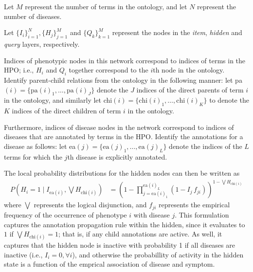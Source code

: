 Let $M$ represent the number of terms in the ontology, and let $N$ represent the
number of diseases.

Let 
$\{I_i\}_{i=1}^{N}, 
\{H_j\}_{j=1}^{M}$ and 
$\{Q_k\}_{k=1}^{M}$ represent the nodes in the {\it item}, {\it hidden} and {\it
query} layers, respectively.

Indices of phenotypic nodes in this network correspond to indices of terms in
the HPO;
%
i.e., $H_i$ and $Q_i$ together correspond to the $i$th node in the ontology.
%
Identify parent-child relations from the ontology in the following manner:
%
let pa$(i) = \{\text{pa}(i)_1, \hdots, \text{pa}(i)_J\}$ denote the $J$ indices
of the direct parents of term $i$ in the ontology, 
%
and similarly let chi$(i) = \{\text{chi}(i)_1, \hdots, \text{chi}(i)_K\}$ to
denote the $K$ indices of the direct children of term $i$ in the ontology.

Furthermore, indices of disease nodes in the network correspond to indices of
diseases that are annotated by terms in the HPO.
%
Identify the annotations for a disease as follows: let ea$(j) =
\{\text{ea}(j)_1, \hdots, \text{ea}(j)_L\}$ denote the indices of the $L$ terms
for which the $j$th disease is explicitly annotated.

The local probability distributions for the hidden nodes can then be written as
%
\begin{align}
    P \left(H_i = 1 \mid I_{\text{ea}(i)}, \bigvee H_{\text{chi}(i)}\right)
    &= \left(
        1 - \prod_{j=\text{ea}(i)_1}^{\text{ea}(i)_L}
        \left(1 - I_j \, f_{ji}\right)
    \right)
    ^{1 - \bigvee H_{\text{chi}(i)}}
    \label{eq:lpdhids}
\end{align}
%
where $\bigvee$ represents the logical disjunction, and $f_{ji}$ represents the
empirical frequency of the occurrence of phenotype $i$ with disease $j$.
%
This formulation captures the annotation propagation rule within the hidden,
since it evaluates to $1$ if $\bigvee H_{\text{chi}(i)} = 1$; that is, if any
child annotations are active.
%
As well, it captures that the hidden node is inactive with probability 1 if all
diseases are inactive (i.e., $I_i = 0, \forall i$), and otherwise the
probabillity of activity in the hidden state is a function of the emprical
association of disease and symptom.

